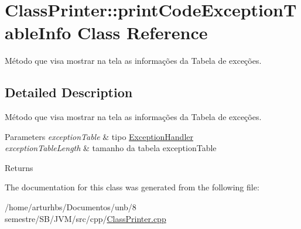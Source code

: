 \hypertarget{classClassPrinter_1_1printCodeExceptionTableInfo}{}\section{Class\+Printer\+:\+:print\+Code\+Exception\+Table\+Info Class Reference}
\label{classClassPrinter_1_1printCodeExceptionTableInfo}


Método que visa mostrar na tela as informações da Tabela de exceções.  




\subsection{Detailed Description}
Método que visa mostrar na tela as informações da Tabela de exceções. 


\begin{DoxyParams}{Parameters}
{\em exception\+Table} & tipo \hyperlink{classExceptionHandler}{Exception\+Handler} \\
\hline
{\em exception\+Table\+Length} & tamanho da tabela exception\+Table \\
\hline
\end{DoxyParams}
\begin{DoxyReturn}{Returns}

\end{DoxyReturn}


The documentation for this class was generated from the following file\+:\begin{DoxyCompactItemize}
\item 
/home/arturhbs/\+Documentos/unb/8 semestre/\+S\+B/\+J\+V\+M/src/cpp/\hyperlink{ClassPrinter_8cpp}{Class\+Printer.\+cpp}\end{DoxyCompactItemize}
